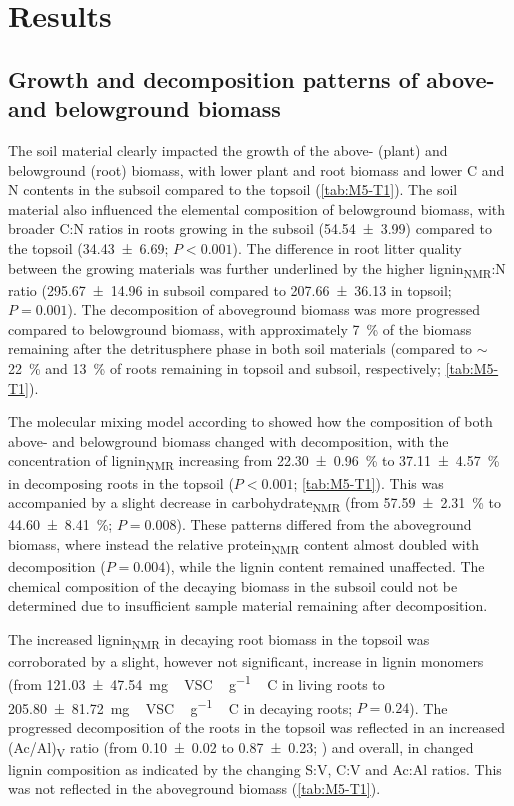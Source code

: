 \section{Results}
\subsection{Growth and decomposition patterns of above- and belowground
biomass}

The soil material clearly impacted the growth of the above- (plant) and belowground (root) biomass, with lower plant and root biomass and lower C and N contents in the subsoil compared to the topsoil (\ref{tab:M5-T1}). The soil material also influenced the elemental composition of belowground biomass, with broader C:N ratios in roots growing in the subsoil (\num{54.54 \pm 3.99}) compared to the topsoil (\num{34.43 \pm 6.69}; \(P < 0.001\)). The difference in root litter quality between the growing materials was further underlined by the higher lignin\textsubscript{NMR}:N ratio (\num{295.67 \pm 14.96} in subsoil compared to \num{207.66 \pm 36.13} in topsoil; \(P= 0.001\)). The decomposition of aboveground biomass was more progressed compared to belowground biomass, with approximately \SI{7}{\percent} of the biomass remaining after the detritusphere phase in both soil materials (compared to \(\sim\)\SI{22}{\percent} and \SI{13}{\percent} of roots remaining in topsoil and subsoil, respectively; \ref{tab:M5-T1}).

The molecular mixing model according to \citet{Nelson2005} showed how the composition of both above- and belowground biomass changed with decomposition, with the concentration of lignin\textsubscript{NMR} increasing from \SI{22.30 \pm 0.96}{\percent} to \SI{37.11 \pm 4.57}{\percent} in decomposing roots in the topsoil (\(P < 0.001\); \ref{tab:M5-T1}). This was accompanied by a slight decrease in carbohydrate\textsubscript{NMR} (from \SI{57.59 \pm 2.31}{\percent} to \SI{44.60 \pm 8.41}{\percent}; \(P= 0.008\)). These patterns differed from the aboveground biomass, where instead the relative protein\textsubscript{NMR} content almost doubled with decomposition (\(P=0.004\)), while the lignin content remained unaffected. The chemical composition of the decaying biomass in the subsoil could not be determined due to insufficient sample material remaining after decomposition.

The increased lignin\textsubscript{NMR} in decaying root biomass in the topsoil was corroborated by a slight, however not significant, increase in lignin monomers (from \SI{121.03 \pm 47.54}{mg\,VSC\,\gram^{-1}\,C} in living roots to \SI{205.80 \pm 81.72}{mg\,VSC\,\gram^{-1}\,C} in decaying roots; \(P=0.24\)). The progressed decomposition of the roots in the topsoil was reflected in an increased (Ac/Al)\textsubscript{V} ratio (from \num{0.10 \pm 0.02} to \num{0.87 \pm 0.23}; \citep{KoegelKnabner1988}) and overall, in changed lignin composition as indicated by the changing S:V, C:V and Ac:Al ratios. This was not reflected in the aboveground biomass (\ref{tab:M5-T1}).

